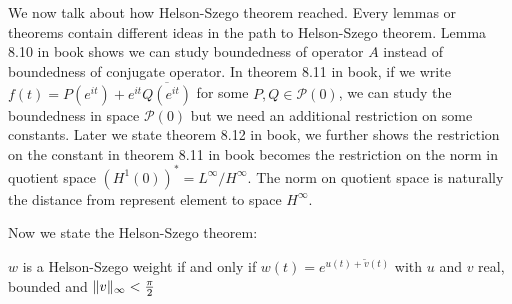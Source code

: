 We now talk about how Helson-Szego theorem reached. Every lemmas or theorems contain different ideas in the path to Helson-Szego theorem.
Lemma 8.10 in book shows we can study boundedness of operator $A$ instead of boundedness of conjugate operator. In theorem 8.11 in book, if we write $f(t)=P(e^{it})+e^{it}\overline{Q(e^{it})}$ for some
$P,Q\in\mathscr{P}(0)$, we can study the boundedness in space $\mathscr{P}(0)$ but we need an additional restriction on some constants.
Later we state theorem 8.12 in book, we further shows the restriction on the constant in theorem 8.11 in book becomes the restriction on the norm in quotient space $(H^1(0))^*=L^\infty/ H^\infty$.
The norm on quotient space is naturally the distance from represent element to space $H^\infty$.\par
Now we state the Helson-Szego theorem:
\begin{theorem}
    $w$ is a Helson-Szego weight if and only if $w(t)=e^{u(t)+\tilde{v}(t)}$ with $u$ and $v$ real, bounded and $\lVert v\rVert_\infty<\frac{\pi}{2}$
\end{theorem}
